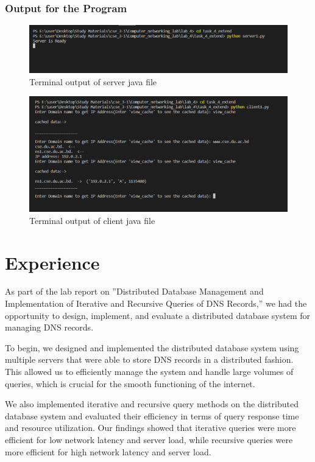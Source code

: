 \documentclass[11pt]{article}
\begin{document}
\subsubsection{Output for the Program}

  \begin{figure}[!h]
\centering
\includegraphics[width=\textwidth]{server3.png}
\caption{Terminal output of server java file }
\end{figure}

 \begin{figure}[!h]
\centering
\includegraphics[width=\textwidth]{client4.png}
\caption{Terminal output of client java file }
\end{figure}
\FloatBarrier 

\section{Experience}
As part of the lab report on ”Distributed Database Management and Implementation of Iterative and Recursive Queries of DNS Records,” we had the opportunity to design, implement, and evaluate a distributed database system for managing DNS records.

To begin, we designed and implemented the distributed database system using multiple servers that were able to store DNS records in a distributed fashion. This allowed us to efficiently manage the system and handle large volumes of queries, which is crucial for the smooth functioning of the internet.

We also implemented iterative and recursive query methods on the distributed database system and evaluated their efficiency in terms of query response time and resource utilization. Our findings showed that iterative queries were more efficient for low network latency and server load, while recursive queries were more efficient for high network latency and server load.
\end{document}
